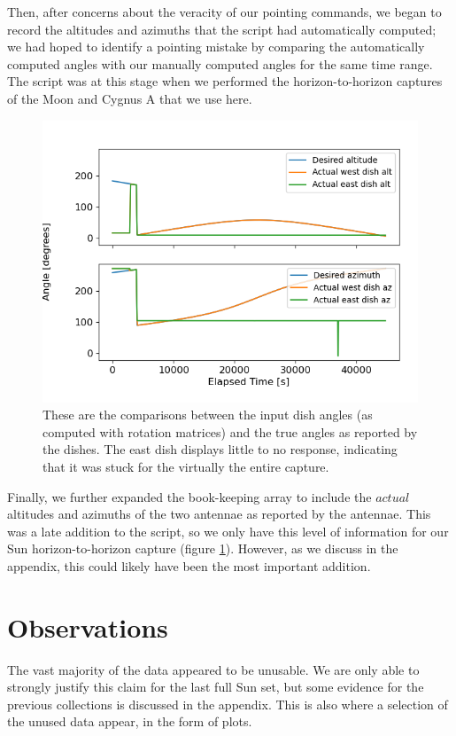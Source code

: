\documentclass[12pt]{article}
\begin{document}
Then, after concerns about the veracity of our pointing commands, we began to record the altitudes and azimuths that the script had automatically computed; we had hoped to identify a pointing mistake by comparing the automatically computed angles with our manually computed angles for the same time range. The script was at this stage when we performed the horizon-to-horizon captures of the Moon and Cygnus A that we use here.

\begin{figure}
	\centering
	\includegraphics[width=.6\linewidth]{lockup}
	\caption{These are the comparisons between the input dish angles (as computed with rotation matrices) and the true angles as reported by the dishes. The east dish displays little to no response, indicating that it was stuck for the virtually the entire capture.}
	\label{fig:stuck}
\end{figure}

Finally, we further expanded the book-keeping array to include the $actual$ altitudes and azimuths of the two antennae as reported by the antennae. This was a late addition to the script, so we only have this level of information for our Sun horizon-to-horizon capture (figure \ref{fig:stuck}). However, as we discuss in the appendix, this could likely have been the most important addition.

\section{Observations}

\quad \quad The vast majority of the data appeared to be unusable. We are only able to strongly justify this claim for the last full Sun set, but some evidence for the previous collections is discussed in the appendix. This is also where a selection of the unused data appear, in the form of plots.
\end{document}
